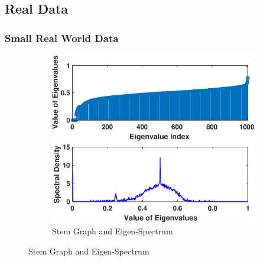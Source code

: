 \documentclass[letterpaper]{article} %
\begin{document}
\subsection{Real Data}

\subsubsection{Small Real World Data}
\begin{figure}
	\centering
	\begin{subfigure}
		\centering
		\includegraphics[trim=0cm 0cm 0.1cm 0.8cm, clip, width=1.0\linewidth]{Figures/Stem_Density_Email.eps}
		\caption{Stem Graph and Eigen-Spectrum}
		\label{subfig:emailerror1}	
	\end{subfigure}%
	

\end{figure}
\end{document}
